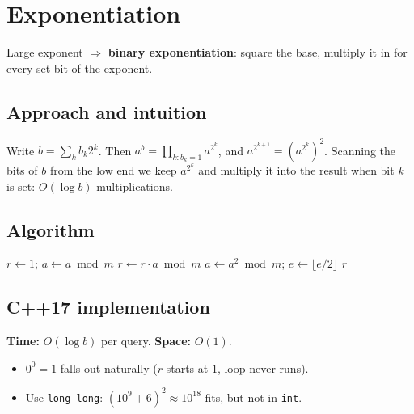 \section{Exponentiation}
\label{sec:n-exp}


\begin{patternbox}
Large exponent $\Rightarrow$ \textbf{binary exponentiation}: square the base,
multiply it in for every set bit of the exponent.
\end{patternbox}

\subsection*{Approach and intuition}

Write $b=\sum_k b_k2^k$. Then $a^b=\prod_{k:b_k=1}a^{2^k}$, and
$a^{2^{k+1}}=(a^{2^k})^2$. Scanning the bits of $b$ from the low end we keep
$a^{2^k}$ and multiply it into the result when bit $k$ is set: $O(\log b)$
multiplications.

\subsection*{Algorithm}
\begin{algorithmic}[1]
  \State $r\gets1$; $a\gets a\bmod m$
     $r\gets r\cdot a\bmod m$ \EndIf
    \State $a\gets a^2\bmod m$; $e\gets\lfloor e/2\rfloor$
  \EndWhile
  \State \Return $r$
\EndFunction
\end{algorithmic}


\subsection*{C++17 implementation}

\begin{complexitybox}
\textbf{Time:} $O(\log b)$ per query. \textbf{Space:} $O(1)$.
\end{complexitybox}

\begin{pitfallbox}
\begin{itemize}
  \item $0^0=1$ falls out naturally ($r$ starts at $1$, loop never runs).
  \item Use \texttt{long long}: $(10^9+6)^2\approx10^{18}$ fits, but not in
        \texttt{int}.
\end{itemize}
\end{pitfallbox}
